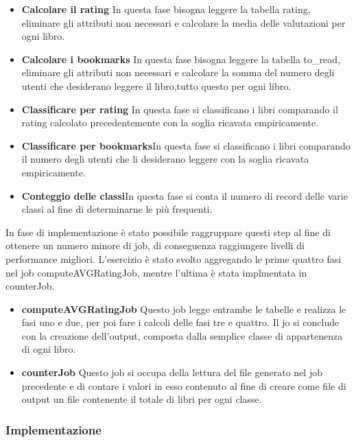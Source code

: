 \begin{itemize}
    \item \textbf{Calcolare il rating} In questa fase bisogna leggere la tabella rating, eliminare gli attributi non necessari
    e calcolare la media delle valutazioni per ogni libro.
    \item \textbf{Calcolare i bookmarks} In questa fase bisogna leggere la tabella to\_read, eliminare gli attributi non necessari
    e calcolare la somma del numero degli utenti che desiderano leggere il libro,tutto questo per ogni libro.
    \item \textbf{Classificare per rating} In questa fase si classificano i libri comparando il rating calcolato
    precedentemente con la soglia ricavata empiricamente.
    \item \textbf{Classificare per bookmarks}In questa fase si classificano i libri comparando il numero degli utenti che li desiderano leggere
    con la soglia ricavata empiricamente.
     \item \textbf{Conteggio delle classi}In questa fase si conta il numero di record delle varie classi al fine di determinarne le più
     frequenti.
\end{itemize}

In fase di implementazione è stato possibile raggruppare questi step al fine di ottenere un numero minore di job, di conseguenza raggiungere
livelli di performance migliori.
L'esercizio è stato svolto aggregando le prime quattro fasi nel job computeAVGRatingJob,
mentre l'ultima è stata implmentata in counterJob.

\begin{itemize}
    \item \textbf{computeAVGRatingJob} Questo job legge entrambe le tabelle e realizza le fasi uno e due, per poi fare i calcoli delle fasi tre e quattro.
    Il jo si conclude con la creazione dell'output, composta dalla semplice classe di appartenenza di ogni libro.
    \item \textbf{counterJob} Questo job si occupa della lettura del file generato nel job precedente e di contare i valori in esso contenuto al
    fine di creare come file di output un file contenente il totale di libri per ogni classe.
\end{itemize}

\subsubsection{Implementazione}

